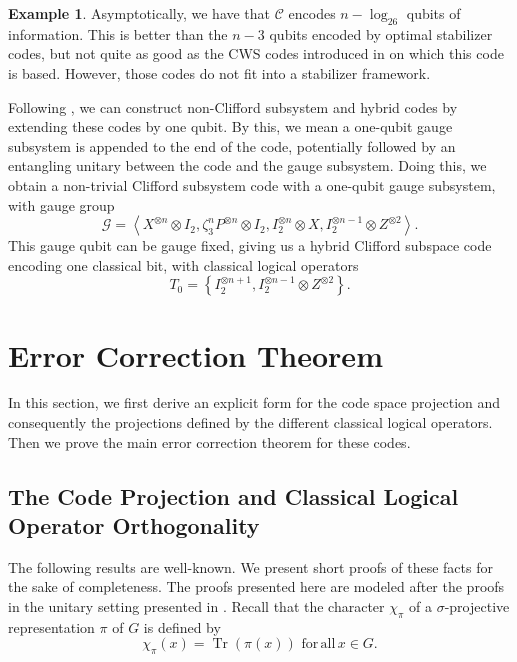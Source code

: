 \documentclass[11pt]{article}
\theoremstyle{definition}
\newtheorem{example}{Example}
\newcommand{\calC}{\mathcal{C}}
\newcommand{\Tr}{\operatorname{Tr}}
\begin{document}
\begin{example}
    Asymptotically, we have that $\calC$ encodes $n-\log_26$ qubits of information. This is better than the $n-3$ qubits encoded by optimal stabilizer codes, but not quite as good as the CWS codes introduced in \cite{Smolin2007} on which this code is based. However, those codes do not fit into a stabilizer framework.
    
    Following \cite{nemec2021infinite}, we can construct non-Clifford subsystem and hybrid codes by extending these codes by one qubit.
    By this, we mean a one-qubit gauge subsystem is appended to the end of the code, potentially followed by an entangling unitary between the code and the gauge subsystem.
    Doing this, we obtain a non-trivial Clifford subsystem code with a one-qubit gauge subsystem, with gauge group
    \begin{equation*}
        \mathcal{G}=\left\langle X^{\otimes n}\otimes I_2,\zeta_3^{n}P^{\otimes n}\otimes I_2,I_2^{\otimes n}\otimes X, I_2^{\otimes n-1}\otimes Z^{\otimes 2}\right\rangle.
    \end{equation*}
    This gauge qubit can be gauge fixed, giving us a hybrid Clifford subspace code encoding one classical bit, with classical logical operators 
    \begin{equation*}
        T_0=\left\{I_2^{\otimes n+1},I_2^{\otimes n-1}\otimes Z^{\otimes 2}\right\}.
    \end{equation*}
\end{example} 

\section{Error Correction Theorem}\label{section: error correction theorem}

In this section, we first derive an explicit form for the code space projection and consequently the projections defined by the different classical logical operators. Then we prove the main error correction theorem for these codes. 

\subsection{The Code Projection and Classical Logical Operator Orthogonality}

The following results are well-known. We present short proofs of these facts for the sake of completeness. The proofs presented here are modeled after the proofs in the unitary setting presented in \cite{Serre77}. Recall that the character $\chi_\pi$ of a $\sigma$-projective representation $\pi$ of $G$ is defined by
\begin{equation*}
    \chi_\pi(x) = \Tr(\pi(x)) \,\, \mathrm{for}\,\mathrm{all}\, x\in G.
\end{equation*}
\end{document}
